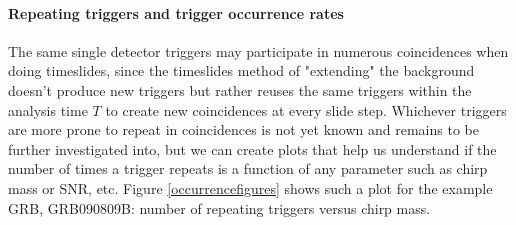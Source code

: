 \documentclass[epsf]{article}
\begin{document}
\paragraph{Repeating triggers and trigger occurrence rates} The same single detector triggers may participate in numerous coincidences when doing timeslides, since the timeslides method of "extending" the background doesn't produce new triggers but rather reuses the same triggers within the analysis time $T$ to create new coincidences at every slide step. Whichever triggers are more prone to repeat in coincidences is not yet known and remains to be further investigated into, but we can create plots that help us understand if the number of times a trigger repeats is a function of any parameter such as chirp mass or SNR, etc. Figure \ref{occurrencefigures} shows such a plot for the example GRB, GRB090809B: number of repeating triggers versus chirp mass.  
\end{document}
